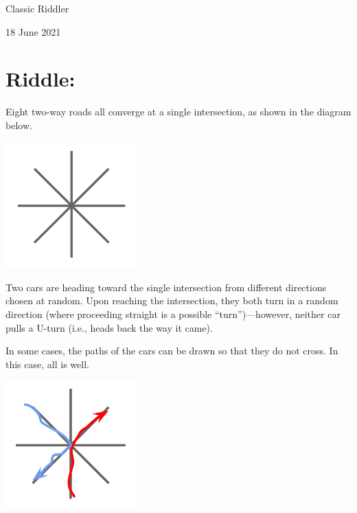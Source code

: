 \documentclass{article}
\begin{document}
\pagestyle{empty} %

\begin{center}
{\LARGE Classic Riddler}

\vspace{0.15in}

{\Large 18 June 2021}
\end{center}


\section*{Riddle:}

Eight two-way roads all converge at a single intersection, as shown in the diagram below.

\vspace{0.1in}
\begin{center}
\includegraphics[width=2in]{roads_1.png}
\end{center}
\vspace{0.1in}

Two cars are heading toward the single intersection from different directions chosen at random.
Upon reaching the intersection, they both turn in a random direction (where proceeding straight is a possible ``turn'')---however, neither car pulls a U-turn (i.e., heads back the way it came).

In some cases, the paths of the cars can be drawn so that they do not cross.
In this case, all is well.

\vspace{0.1in}
\begin{center}
\includegraphics[width=2in]{roads_2.png}
\end{center}
\vspace{0.1in}
\end{document}
